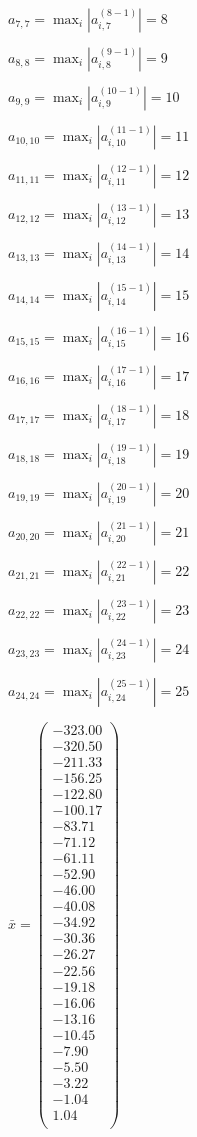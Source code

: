 \documentclass[a4paper,12pt]{article}
\begin{document}
$a _{ 7, 7 } =  \max _i |a _{ i, 7 } ^{ (8 - 1) } | = 8$

$a _{ 8, 8 } =  \max _i |a _{ i, 8 } ^{ (9 - 1) } | = 9$

$a _{ 9, 9 } =  \max _i |a _{ i, 9 } ^{ (10 - 1) } | = 10$

$a _{ 10, 10 } =  \max _i |a _{ i, 10 } ^{ (11 - 1) } | = 11$

$a _{ 11, 11 } =  \max _i |a _{ i, 11 } ^{ (12 - 1) } | = 12$

$a _{ 12, 12 } =  \max _i |a _{ i, 12 } ^{ (13 - 1) } | = 13$

$a _{ 13, 13 } =  \max _i |a _{ i, 13 } ^{ (14 - 1) } | = 14$

$a _{ 14, 14 } =  \max _i |a _{ i, 14 } ^{ (15 - 1) } | = 15$

$a _{ 15, 15 } =  \max _i |a _{ i, 15 } ^{ (16 - 1) } | = 16$

$a _{ 16, 16 } =  \max _i |a _{ i, 16 } ^{ (17 - 1) } | = 17$

$a _{ 17, 17 } =  \max _i |a _{ i, 17 } ^{ (18 - 1) } | = 18$

$a _{ 18, 18 } =  \max _i |a _{ i, 18 } ^{ (19 - 1) } | = 19$

$a _{ 19, 19 } =  \max _i |a _{ i, 19 } ^{ (20 - 1) } | = 20$

$a _{ 20, 20 } =  \max _i |a _{ i, 20 } ^{ (21 - 1) } | = 21$

$a _{ 21, 21 } =  \max _i |a _{ i, 21 } ^{ (22 - 1) } | = 22$

$a _{ 22, 22 } =  \max _i |a _{ i, 22 } ^{ (23 - 1) } | = 23$

$a _{ 23, 23 } =  \max _i |a _{ i, 23 } ^{ (24 - 1) } | = 24$

$a _{ 24, 24 } =  \max _i |a _{ i, 24 } ^{ (25 - 1) } | = 25$

$\bar { x } = \begin{pmatrix}
-323.00 \\
-320.50 \\
-211.33 \\
-156.25 \\
-122.80 \\
-100.17 \\
-83.71 \\
-71.12 \\
-61.11 \\
-52.90 \\
-46.00 \\
-40.08 \\
-34.92 \\
-30.36 \\
-26.27 \\
-22.56 \\
-19.18 \\
-16.06 \\
-13.16 \\
-10.45 \\
-7.90 \\
-5.50 \\
-3.22 \\
-1.04 \\
1.04 \\
\end{pmatrix}
$
\end{document}
